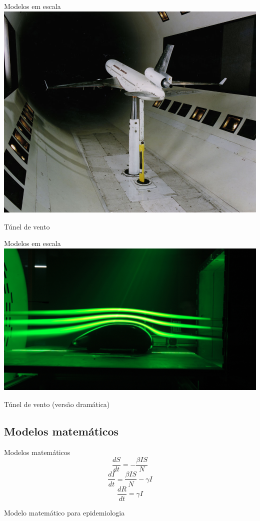 \documentclass{beamer}
\begin{document}
\begin{frame}{Modelos em escala}
  \centering
  \includegraphics[width=.8\textwidth]{modelos/MD-11_12ft_Wind_Tunnel_Test}

Túnel de vento
\end{frame}

\begin{frame}{Modelos em escala}
  \centering
  \includegraphics[width=\textwidth]{modelos/wind_tunel}

Túnel de vento (versão dramática)
\end{frame}

\subsection{Modelos matemáticos}

\begin{frame}{Modelos matemáticos}
  \centering
  \begin{displaymath}
    \frac{dS}{dt} = -\frac{\beta I S}{N}
  \end{displaymath}
  \begin{displaymath}
    \frac{dI}{dt} = \frac{\beta I S}{N} - \gamma I
  \end{displaymath}
  \begin{displaymath}
    \frac{dR}{dt} = \gamma I
  \end{displaymath}

\bigskip
Modelo matemático para epidemiologia
\end{frame}
\end{document}

